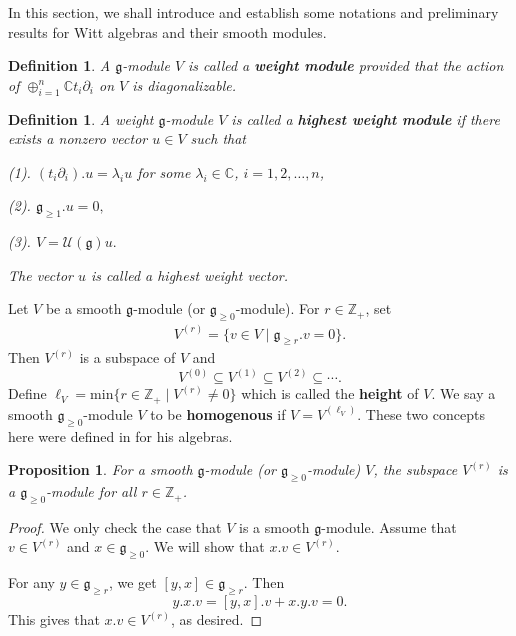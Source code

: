 \documentclass[12pt, a4paper]{amsart}
\newcommand{\fg}{\mathfrak g}
\newcommand{\C}{\mathbb{C}}
\newcommand{\Z}{\mathbb Z}
\newcommand{\U}{\mathcal{U}}
\theoremstyle{Theorem}
\theoremstyle{Theorem}
\newtheorem{proposition}[thm]{Proposition}
\newtheorem{definition}[thm]{Definition}
\numberwithin{equation}{section}
\begin{document}
In this section, we shall introduce and establish some notations and preliminary results for Witt algebras and their smooth modules.


\begin{definition}
	
	A $\fg$-module $V$ is called a {\bf weight module} provided that the action of $\oplus_{i=1}^{n}\C t_{i}\partial_{i}$
	on $V$ is diagonalizable.\end{definition}

\begin{definition} A weight $\fg$-module $V$ is called a {{\bf highest weight module}} if there exists a nonzero vector $u\in V$ such that
	
	(1). $(t_{i}\partial_{i}).u=\lambda_{i}u$ for some $\lambda_{i}\in\C$, $i=1,2,\dots,n$,
	
	(2). 	$\fg_{\geq1}.u=0,$
	
	(3). $  V=\U(\fg)u.$
	
	The vector $u$ is called a highest weight vector.
\end{definition}




Let $V$ be a smooth $\fg$-module (or $\fg_{\geq0}$-module). For $r\in\Z_{+}$, set
\begin{align}
	V^{(r)}=\{v\in V\mid \fg_{\geq r}.v=0\}.
\end{align}
Then $V^{(r)}$ is a subspace of $V$ and
\[V^{(0)}\subseteq V^{(1)}\subseteq V^{(2)}\subseteq\cdots.\]
Define $\ell_{V}=\mathrm{min}\{r\in\Z_{+}\mid V^{(r)}\neq 0\}$ which is called the {\bf height} of $V$.
We say a smooth $\fg_{\geq0}$-module $V$ to be {\bf homogenous} if $V=V^{(\ell_{V})}$.
These two concepts here were defined  in \cite{R} for his algebras.

\begin{proposition}\label{G-0-module}
	For a smooth $\fg$-module (or $\fg_{\geq0}$-module) $V$, the subspace  $V^{(r)}$ is
	a $\fg_{\geq0}$-module for all $r\in\Z_{+}$.
\end{proposition}
\begin{proof} We only check the case that $V$ is a smooth $\fg$-module.
	Assume that $v\in V^{(r)}$ and $x\in\fg_{\geq 0}$. We will show that $x.v\in V^{(r)}$.
	
	For any $y\in\fg_{\ge r}$, we get $[y,x]\in\fg_{\ge r}$. Then
	\[y.x.v=[y,x].v+x.y.v=0.\]
	This gives that $x.v\in V^{(r)}$, as desired.
\end{proof}
\end{document}
